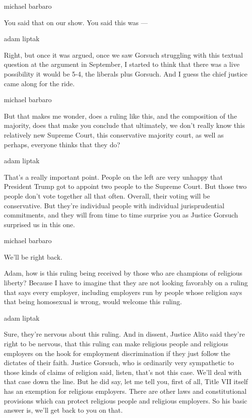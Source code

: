 michael barbaro

You said that on our show. You said this was ---

adam liptak

Right, but once it was argued, once we saw Gorsuch struggling with this
textual question at the argument in September, I started to think that
there was a live possibility it would be 5-4, the liberals plus Gorsuch.
And I guess the chief justice came along for the ride.

michael barbaro

But that makes me wonder, does a ruling like this, and the composition
of the majority, does that make you conclude that ultimately, we don't
really know this relatively new Supreme Court, this conservative
majority court, as well as perhaps, everyone thinks that they do?

adam liptak

That's a really important point. People on the left are very unhappy
that President Trump got to appoint two people to the Supreme Court. But
those two people don't vote together all that often. Overall, their
voting will be conservative. But they're individual people with
individual jurisprudential commitments, and they will from time to time
surprise you as Justice Gorsuch surprised us in this one.

michael barbaro

We'll be right back.

Adam, how is this ruling being received by those who are champions of
religious liberty? Because I have to imagine that they are not looking
favorably on a ruling that says every employer, including employers run
by people whose religion says that being homosexual is wrong, would
welcome this ruling.

adam liptak

Sure, they're nervous about this ruling. And in dissent, Justice Alito
said they're right to be nervous, that this ruling can make religious
people and religious employers on the hook for employment discrimination
if they just follow the dictates of their faith. Justice Gorsuch, who is
ordinarily very sympathetic to those kinds of claims of religion said,
listen, that's not this case. We'll deal with that case down the line.
But he did say, let me tell you, first of all, Title VII itself has an
exemption for religious employers. There are other laws and
constitutional provisions which can protect religious people and
religious employers. So his basic answer is, we'll get back to you on
that.

